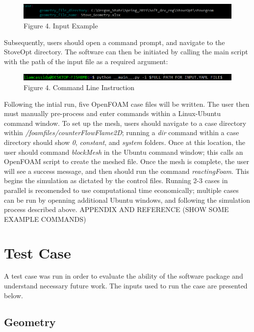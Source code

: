 \documentclass[3p,times,twocolumn]{elsarticle}
\begin{document}
\begin{figure}
	\includegraphics[width=\linewidth]{inputyamlex.PNG}
	\caption{Figure 4. Input Example}
\end{figure}

Subsequently, users should open a command prompt, and navigate to the StoveOpt directory. The software can then be initiated by calling the main script with the path of the input file as a required argument:

\begin{figure}{\linewidth}
	\includegraphics[width=\linewidth]{commandline.PNG}
	\caption{Figure 4. Command Line Instruction}
\end{figure}


Following the intial run, five OpenFOAM case files will be written. The user then must manually pre-process and enter commands within a Linux-Ubuntu command window. To set up the mesh, users should navigate to a case directory within \textit{/foamfiles/counterFlowFlame2D}; running a \textit{dir} command within a case directory should show \textit{0}, \textit{constant}, and \textit{system} folders. Once at this location, the user should command \textit{blockMesh} in the Ubuntu command window; this calls an OpenFOAM script to create the meshed file. Once the mesh is complete, the user will see a success message, and then should run the command \textit{reactingFoam}. This begins the simulation as dictated by the control files. Running 2-3 cases in parallel is recomended to use computational time economically; multiple cases can be run by openning additional Ubuntu windows, and following the simulation process described above. 
APPENDIX AND REFERENCE (SHOW SOME EXAMPLE COMMANDS)

\section{Test Case}
A test case was run in order to evaluate the ability of the software package and understand necessary future work. The inputs used to run the case are presented below.

\subsection{Geometry}
\end{document}
